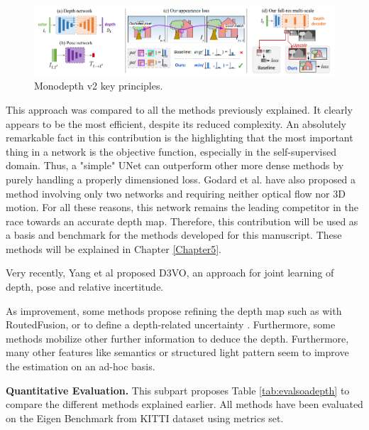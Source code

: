 \begin{figure}[h]
	\centering
	\includegraphics[width=0.8\linewidth]{Figures/SOA/godardillu}
	\caption[Monodepth v2 key principles.]{Monodepth v2 \cite{godard2019digging} key principles.}
	\label{godardillu}
\end{figure}

This approach was compared to all the methods previously explained. It clearly appears to be the most efficient, despite its reduced complexity. An absolutely remarkable fact in this contribution is the highlighting that the most important thing in a network is the objective function, especially in the self-supervised domain. Thus, a "simple" UNet can outperform other more dense methods by purely handling a properly dimensioned loss. Godard et al. have also proposed a method involving only two networks and requiring neither optical flow nor 3D motion. 
For all these reasons, this network remains the leading competitor in the race towards an accurate depth map. Therefore, this contribution will be used as a basis and benchmark for the methods developed for this manuscript. These methods will be explained in Chapter \ref{Chapter5}.



Very recently, Yang et al \cite{yang2020d3vo} proposed D3VO, an approach for joint learning of depth, pose and relative incertitude.


As improvement, some methods propose refining the depth map such as \cite{weder2020routedfusion} with RoutedFusion, or to define a depth-related uncertainty \cite{poggi2020uncertainty}.
Furthermore, some methods mobilize other further information to deduce the depth. Furthermore, many other features like semantics \cite{chen2019towards} or structured light pattern \cite{riegler2019connecting} seem to improve the estimation on an ad-hoc basis.




\textbf{Quantitative Evaluation.} This subpart proposes Table \ref{tab:evalsoadepth} to compare the different methods explained earlier. All methods have been evaluated on the Eigen Benchmark from KITTI dataset \cite{Geiger2012CVPR} using \cite{eigen2014depth} metrics set.

